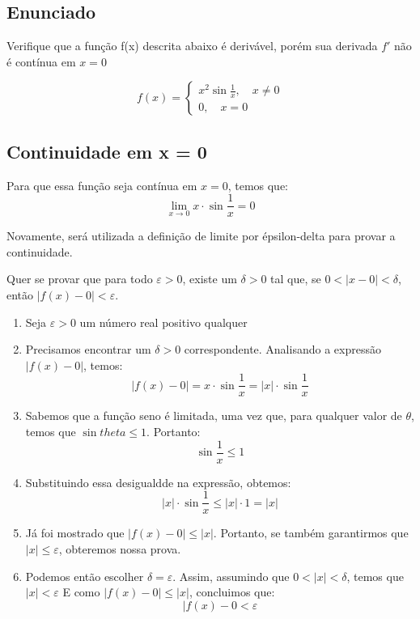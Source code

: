 \documentclass[../resumo.tex]{subfiles}
\begin{document}
	\subsection{Enunciado}

	Verifique que a função f(x) descrita abaixo é derivável, porém sua derivada
	$f'$ não é contínua em $x = 0$

	\begin{equation*}
			f(x) =
			\begin{cases}
					x^2\sin{\frac{1}{x}}, \quad x \neq 0 \\
					0, \quad x = 0
			\end{cases}
	\end{equation*}

	\subsection{Continuidade em x = 0}

	Para que essa função seja contínua em $x = 0$, temos que:
	\[\lim_{x\to0} x\cdot\sin{\frac{1}{x}} = 0\]

	Novamente, será utilizada a definição de limite por épsilon-delta para provar a continuidade.

	Quer se provar que para todo $\varepsilon > 0$, existe um $\delta > 0$ tal que, se
	$0 < |x - 0| < \delta$, então $|f(x) - 0| < \varepsilon$.
	\begin{enumerate}
			\item Seja $\varepsilon > 0$ um número real positivo qualquer
			\item Precisamos encontrar um $\delta > 0$ correspondente. Analisando a expressão $|f(x) - 0|$, temos:
			\[|f(x) - 0| = x\cdot\sin{\frac{1}{x}} = |x|\cdot\sin{\frac{1}{x}}\]
			\item Sabemos que a função seno é limitada, uma vez que, para qualquer valor de $\theta$, temos que
			$\sin{theta} \leq 1$. Portanto:
			\[\sin{\frac{1}{x}} \leq 1\]
			\item Substituindo essa desigualdde na expressão, obtemos:
			\[|x|\cdot\sin{\frac{1}{x}} \leq |x|\cdot1 = |x|\]
			\item Já foi mostrado que $|f(x) - 0| \leq |x|$. Portanto, se também garantirmos que
			$|x| \leq \varepsilon$, obteremos nossa prova.
			\item Podemos então escolher $\delta = \varepsilon$. Assim, assumindo que $0 < |x| < \delta$, temos
			que $|x| < \varepsilon$
			E como $|f(x)-0| \leq |x|$, concluimos que:
			\[|f(x)-0 < \varepsilon\]
	\end{enumerate}
\end{document}
